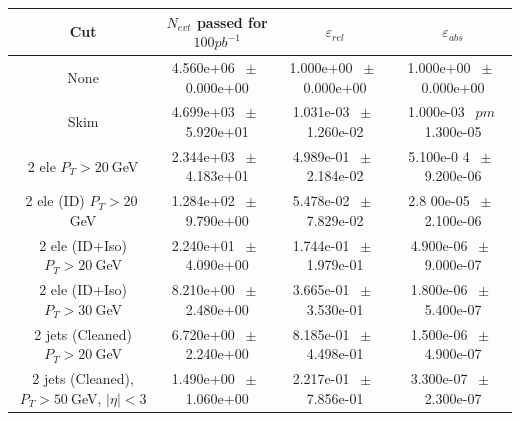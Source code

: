 \begin{table}[htbp]
\begin{center}
\begin{tabular}{|c|c|c|c|}
\hline\hline
 Cut & $N_{evt}$ passed for $100pb^{-1}$ & $\varepsilon_{rel}$ & $\varepsilon_{abs}$ \\
\hline\hline
None          &           4.560e+06          $~\pm~$          0.000e+00           &           1.000e+00          $~\pm~$          0.000e+00           &           1.000e+00          $~\pm~$
    0.000e+00          \\
          Skim          &           4.699e+03          $~\pm~$          5.920e+01           &           1.031e-03          $~\pm~$          1.260e-02           &           1.000e-03          $~\
pm~$          1.300e-05          \\
          2 ele $P_T>20~$GeV          &           2.344e+03          $~\pm~$          4.183e+01           &           4.989e-01          $~\pm~$          2.184e-02           &           5.100e-0
4          $~\pm~$          9.200e-06          \\
          2 ele (ID) $P_T>20~$GeV          &           1.284e+02          $~\pm~$          9.790e+00           &           5.478e-02          $~\pm~$          7.829e-02           &           2.8
00e-05          $~\pm~$          2.100e-06          \\
          2 ele (ID+Iso) $P_T>20~$GeV          &           2.240e+01          $~\pm~$          4.090e+00           &           1.744e-01          $~\pm~$          1.979e-01           &
 4.900e-06          $~\pm~$          9.000e-07          \\
          2 ele (ID+Iso) $P_T>30~$GeV          &           8.210e+00          $~\pm~$          2.480e+00           &           3.665e-01          $~\pm~$          3.530e-01           &
 1.800e-06          $~\pm~$          5.400e-07          \\
          2 jets (Cleaned) $P_T>20~$GeV          &           6.720e+00          $~\pm~$          2.240e+00           &           8.185e-01          $~\pm~$          4.498e-01           &
   1.500e-06          $~\pm~$          4.900e-07          \\
          2 jets (Cleaned), $P_T>50~$GeV, $ | \eta |<3$          &           1.490e+00          $~\pm~$          1.060e+00           &           2.217e-01          $~\pm~$          7.856e-01
       &           3.300e-07          $~\pm~$          2.300e-07          \\

\end{tabular}
\end{center}
\end{table}

